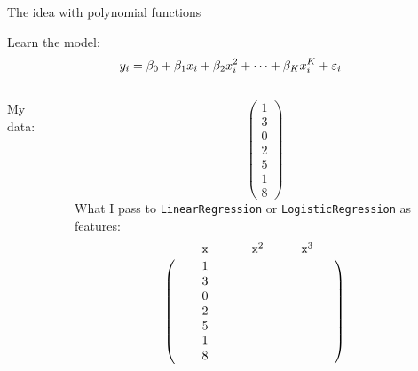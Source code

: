 \documentclass[aspectratio=169,usenames,dvipsnames]{beamer}
\begin{document}
\begin{frame}[c]{The idea with polynomial functions}

Learn the model:
\begin{equation*}
	y_i = \beta_0 + \beta_1 x_i + \beta_2 x_i^2 + \cdots + \beta_K x_i^K + \varepsilon_i
\end{equation*}

\begin{columns}
\centering
My data:

\begin{equation*}
	\begin{pmatrix}
		1 \\
		3 \\
		0 \\
		2 \\
		5 \\
		1 \\
		8
	\end{pmatrix}
\end{equation*}
\centering
What I pass to \texttt{LinearRegression} or \texttt{LogisticRegression} as features:
\begin{equation*}
		\bordermatrix{ & \texttt{x} & \texttt{x}^2 & \texttt{x}^3 \cr
			 &\qquad  1 \qquad & \qquad  & \qquad \qquad\cr
			 &\qquad  3 \qquad &  &  \cr
			 &\qquad  0 \qquad &  &  \cr
			 &\qquad  2 \qquad &  &  \cr
			 &\qquad  5 \qquad &  &  \cr
			 &\qquad  1 \qquad &  &  \cr
			 &\qquad  8 \qquad &  &  \cr
			 } \qquad
\end{equation*}

\end{columns}

\end{frame}
\end{document}
